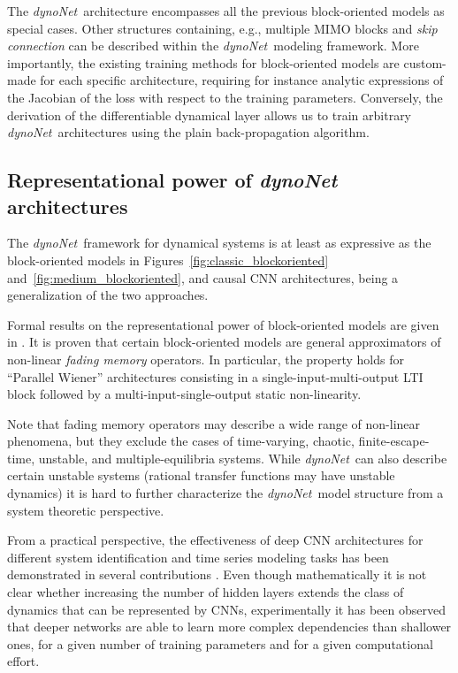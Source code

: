 \documentclass{article}
\newcommand{\Name}{\emph{dynoNet}}
\begin{document}
The \Name\ architecture encompasses all the previous block-oriented models as special cases. Other structures containing, e.g., multiple MIMO blocks and \emph{skip connection} can be described within the \Name  \ modeling framework.
More importantly,  the existing training methods for block-oriented models are custom-made for each specific architecture, requiring for instance analytic expressions of the Jacobian of the loss with respect to the training parameters. Conversely, the derivation of the differentiable dynamical layer allows us to train arbitrary \Name \  architectures using the plain back-propagation algorithm. 

\subsection{Representational power of \emph{dynoNet} architectures}
The \Name\ framework for dynamical systems is at least as expressive as the block-oriented models in Figures~\ref{fig:classic_blockoriented} and~\ref{fig:medium_blockoriented}, and causal CNN architectures, being a generalization of the two approaches.


Formal results on the representational power of block-oriented models are given in \cite{palm:1979representation, boyd:1985fading}. It is proven that certain block-oriented models are general approximators of non-linear \emph{fading memory} operators. In particular, the property holds for ``Parallel Wiener'' architectures consisting in a  single-input-multi-output LTI block followed by a multi-input-single-output static non-linearity. 

Note that fading memory operators may describe a wide range of non-linear phenomena, but they exclude the cases of time-varying, chaotic, finite-escape-time, unstable, and multiple-equilibria systems. While \Name\ can also describe certain unstable systems
(rational transfer functions may have unstable dynamics) it is hard to further characterize the \Name\ model 
structure from a system theoretic perspective.

From a practical perspective, the effectiveness of deep CNN architectures for different system identification and 
time series modeling tasks has been demonstrated in several contributions \cite{ wang2017time,bai2018empirical,andersson:2019deep}. %
Even though mathematically it is not clear whether increasing the number of hidden layers extends the class of dynamics that can be represented by CNNs, experimentally it has been observed that deeper networks are able to learn more complex dependencies than shallower ones, for a given number of training parameters and for a given computational effort.%
\end{document}
